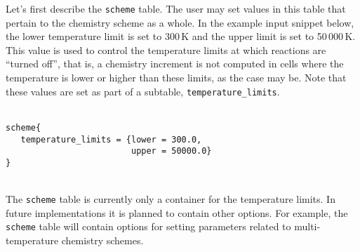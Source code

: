 Let's first describe the \texttt{scheme} table.
The user may set values in this table that pertain to the chemistry scheme as a whole.
In the example input snippet below, the lower temperature limit is set to 300\,K
and the upper limit is set to 50\,000\,K.
This value is used to control the temperature limits at which reactions are
``turned off'', that is, a chemistry increment is not computed in cells where the
temperature is lower or higher than these limits, as the case may be.
Note that these values are set as part of a subtable, \texttt{temperature\_limits}.\\
%
\topbar\\
\begin{verbatim}
scheme{
   temperature_limits = {lower = 300.0,
                         upper = 50000.0}
}
\end{verbatim}
\bottombar\\
%
The \texttt{scheme} table is currently only a container for the temperature limits.
In future implementations it is planned to contain other options.
For example, the \texttt{scheme} table will contain options for setting parameters related
to multi-temperature chemistry schemes.

